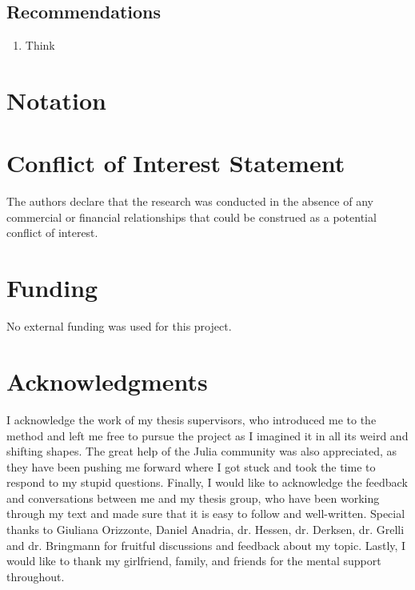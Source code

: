 \documentclass[utf8]{FrontiersinVancouver}
\begin{document}
\subsection{Recommendations}
\begin{enumerate}
    \item{Think }
    
\end{enumerate}


\section*{Notation}

\section*{Conflict of Interest Statement}
The authors declare that the research was conducted in the absence of any commercial or financial relationships that could be construed as a potential conflict of interest.

\section*{Funding}
No external funding was used for this project.

\section*{Acknowledgments}
I acknowledge the work of my thesis supervisors, who introduced me to the method and left me free to pursue the project as I imagined it in all its weird and shifting shapes.  The great help of the Julia community was also appreciated, as they have been pushing me forward where I got stuck and took the time to respond to my stupid questions. Finally, I would like to acknowledge the feedback and conversations between me and my thesis group, who have been working through my text and made sure that it is easy to follow and well-written. Special thanks to Giuliana Orizzonte, Daniel Anadria, dr. Hessen, dr. Derksen, dr. Grelli and dr. Bringmann for fruitful discussions and feedback about my topic. Lastly, I would like to thank my girlfriend, family, and friends for the mental support throughout.
\end{document}
